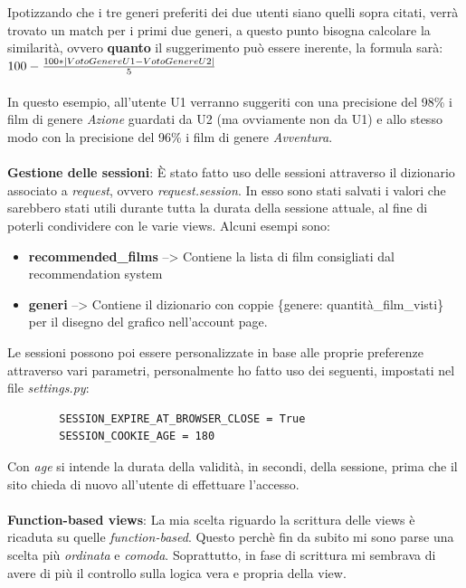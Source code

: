 \documentclass[12pt]{article}
\begin{document}
	\noindent Ipotizzando che i tre generi preferiti dei due utenti siano quelli sopra citati, verrà trovato un match per i primi due generi, a questo punto bisogna calcolare la similarità, ovvero \textbf{quanto} il suggerimento può essere inerente, la formula sarà: \\
	
	$100 - {100 * |VotoGenereU1-VotoGenereU2| \over 5}$ \\ \\
	
	\noindent In questo esempio, all'utente U1 verranno suggeriti con una precisione del 98\% i film di genere \textit{Azione} guardati da U2 (ma ovviamente non da U1) e allo stesso modo con la precisione del 96\% i film di genere \textit{Avventura}. \\ \\
	
	\noindent \textbf{Gestione delle sessioni}: È stato fatto uso delle sessioni attraverso il dizionario associato a \textit{request}, ovvero \textit{request.session}. In esso sono stati salvati i valori che sarebbero stati utili durante tutta la durata della sessione attuale, al fine di poterli condividere con le varie views. Alcuni esempi sono:
	\begin{itemize}
		\item \textbf{recommended\_films} --> Contiene la lista di film consigliati dal recommendation system
		\item \textbf{generi} --> Contiene il dizionario con coppie \{genere: quantità\_film\_visti\} per il disegno del grafico nell'account page. \\
	\end{itemize}
	Le sessioni possono poi essere personalizzate in base alle proprie preferenze attraverso vari parametri, personalmente ho fatto uso dei seguenti, impostati nel file \textit{settings.py}:
	\begin{verbatim}
		SESSION_EXPIRE_AT_BROWSER_CLOSE = True
		SESSION_COOKIE_AGE = 180
	\end{verbatim}
	
	\noindent Con \textit{age} si intende la durata della validità, in secondi, della sessione, prima che il sito chieda di nuovo all'utente di effettuare l'accesso. \\ \\
	
	\noindent \textbf{Function-based views}: La mia scelta riguardo la scrittura delle views è ricaduta su quelle \textit{function-based}. Questo perchè fin da subito mi sono parse una scelta più \textit{ordinata} e \textit{comoda}. Soprattutto, in fase di scrittura mi sembrava di avere di più il controllo sulla logica vera e propria della view. \\ \\
	
\end{document}
